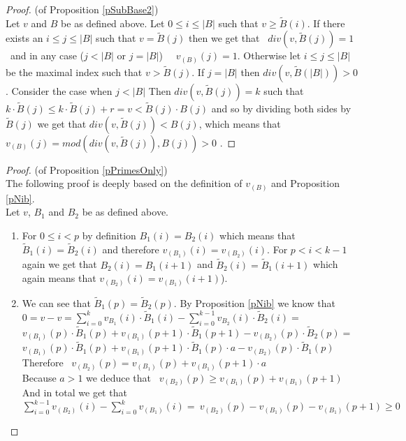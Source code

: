 \documentclass[envcountsame]{llncs}
\begin{document}
\begin{proof}(of Proposition \ref{pSubBase2})\\
	Let $v$ and $B$ be as defined above. 
	Let $0\leq i \leq |B|$ such that $v\geq \tilde B(i)$. 
	If there exists an $i\leq j \leq |B|$ such that $v=\tilde B(j)$ then 
	we get that \ $div(v,\tilde B(j))=1$ \ and in any case ($j<|B|$ or $j=|B|$) \ \  $v_{(B)}(j)=1$.
	Otherwise let $i \leq j \leq |B|$ be the maximal index such that $v > \tilde B(j)$.
	If $j=|B|$ then $div(v,\tilde B(|B|))>0$. Consider the case when $j<|B|$
	Then $div(v,\tilde B(j))=k$ such that \  $k \cdot \tilde B(j) \leq k \cdot \tilde B(j)+ r=v< \tilde B(j)\cdot B(j)$  
	and so by dividing both sides by $\tilde B(j)$ we get that $div(v,\tilde B(j)) < B(j)$,
	which means that  $v_{(B)}(j)=mod(div(v,\tilde B(j)),B(j))>0$ .
\end{proof} \bigskip

 \begin{proof}(of Proposition \ref{pPrimesOnly})
	 \\The following proof is deeply based on the definition of $v_{(B)}$ and Proposition \ref{pNib}.\\
	Let $v$, $B_1$ and $B_2$ be as defined above.
	\begin{enumerate}
		\item 
			For $0\leq i < p$  by definition  $B_1(i)=B_2(i)$
			which means that $\tilde B_1(i)= \tilde B_2(i)$ and therefore $v_{(B_1)}(i)=v_{(B_2)}(i)$. 
			For $p< i<k-1$  again we get that $B_{2}(i)=B_{1}(i+1)$ 
			and  $\tilde B_{2}(i)=\tilde B_{1}(i+1)$ which again means that $v_{(B_2)}(i)=v_{(B_1)}(i+1)$). 
		\item 
  			We can see that $\tilde B_1(p)=\tilde B_2(p)$.  By Proposition \ref{pNib} we know that \\
			$0=v-v=\sum_{i=0}^{k}v_{B_1}(i)\cdot \tilde B_1(i) - \sum_{i=0}^{k-1}v_{B_2}(i) \cdot \tilde B_2(i)=$\\
			$v_{(B_1)}(p)\cdot \tilde B_1(p)+v_{(B_1)}(p+1)\cdot \tilde B_1(p+1)-v_{(B_2)}(p)\cdot \tilde B_2(p)=$\\
			$v_{(B_1)}(p)\cdot \tilde B_1(p)+v_{(B_1)}(p+1)\cdot \tilde B_1(p)\cdot a-v_{(B_2)}(p)\cdot \tilde B_1(p)$\\
			Therefore \  $v_{(B_2)}(p)=v_{(B_1)}(p)+v_{(B_1)}(p+1)\cdot a$ \\
			 Because $a>1$ we deduce that \ $v_{(B_2)}(p) \geq v_{(B_1)}(p)+v_{(B_1)}(p+1)$ \\
			And in total we get that  \\
			$ \sum_{i=0}^{k-1}v_{(B_2)}(i) - \sum_{i=0}^{k}v_{(B_1)}(i) =  \
			v_{(B_2)}(p) - v_{(B_1)}(p)- v_{(B_1)}(p+1) \geq 0$	
	\end{enumerate}
\end{proof} \bigskip 
\end{document}

